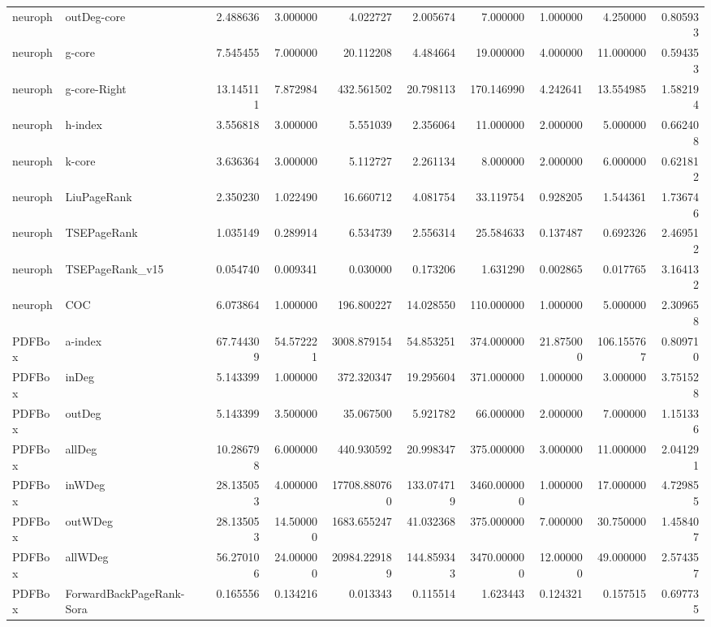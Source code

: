 \begin{tabular}{llrrrrrrrr}
neuroph & outDeg-core & 2.488636 & 3.000000 & 4.022727 & 2.005674 & 7.000000 & 1.000000 & 4.250000 & 0.805933 \\
neuroph & g-core & 7.545455 & 7.000000 & 20.112208 & 4.484664 & 19.000000 & 4.000000 & 11.000000 & 0.594353 \\
neuroph & g-core-Right & 13.145111 & 7.872984 & 432.561502 & 20.798113 & 170.146990 & 4.242641 & 13.554985 & 1.582194 \\
neuroph & h-index & 3.556818 & 3.000000 & 5.551039 & 2.356064 & 11.000000 & 2.000000 & 5.000000 & 0.662408 \\
neuroph & k-core & 3.636364 & 3.000000 & 5.112727 & 2.261134 & 8.000000 & 2.000000 & 6.000000 & 0.621812 \\
neuroph & LiuPageRank & 2.350230 & 1.022490 & 16.660712 & 4.081754 & 33.119754 & 0.928205 & 1.544361 & 1.736746 \\
neuroph & TSEPageRank & 1.035149 & 0.289914 & 6.534739 & 2.556314 & 25.584633 & 0.137487 & 0.692326 & 2.469512 \\
neuroph & TSEPageRank_v15 & 0.054740 & 0.009341 & 0.030000 & 0.173206 & 1.631290 & 0.002865 & 0.017765 & 3.164132 \\
neuroph & COC & 6.073864 & 1.000000 & 196.800227 & 14.028550 & 110.000000 & 1.000000 & 5.000000 & 2.309658 \\
PDFBox & a-index & 67.744309 & 54.572221 & 3008.879154 & 54.853251 & 374.000000 & 21.875000 & 106.155767 & 0.809710 \\
PDFBox & inDeg & 5.143399 & 1.000000 & 372.320347 & 19.295604 & 371.000000 & 1.000000 & 3.000000 & 3.751528 \\
PDFBox & outDeg & 5.143399 & 3.500000 & 35.067500 & 5.921782 & 66.000000 & 2.000000 & 7.000000 & 1.151336 \\
PDFBox & allDeg & 10.286798 & 6.000000 & 440.930592 & 20.998347 & 375.000000 & 3.000000 & 11.000000 & 2.041291 \\
PDFBox & inWDeg & 28.135053 & 4.000000 & 17708.880760 & 133.074719 & 3460.000000 & 1.000000 & 17.000000 & 4.729855 \\
PDFBox & outWDeg & 28.135053 & 14.500000 & 1683.655247 & 41.032368 & 375.000000 & 7.000000 & 30.750000 & 1.458407 \\
PDFBox & allWDeg & 56.270106 & 24.000000 & 20984.229189 & 144.859343 & 3470.000000 & 12.000000 & 49.000000 & 2.574357 \\
PDFBox & ForwardBackPageRank-Sora & 0.165556 & 0.134216 & 0.013343 & 0.115514 & 1.623443 & 0.124321 & 0.157515 & 0.697735 \\

\end{tabular}
